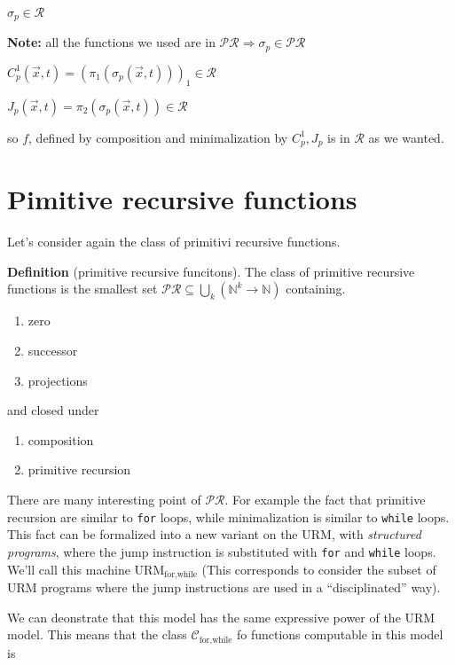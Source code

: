 \documentclass{amsbook}
\theoremstyle{definition}
\theoremstyle{remark}
\numberwithin{section}{chapter}
\numberwithin{equation}{chapter}
\begin{document}
$\sigma_p \in \mathcal{R}$

\textbf{Note:} all the functions we used are in  $\mathcal{PR} \Rightarrow \sigma_p \in \mathcal{PR}$

$C_p^1(\vec{x}, t) = (\pi_1(\sigma_p(\vec{x}, t)))_1 \in \mathcal{R}$

$J_p(\vec{x}, t) = \pi_2(\sigma_p(\vec{x}, t)) \in \mathcal{R}$

so $f$, defined by composition and minimalization by $C_p^1, J_p$ is in $\mathcal{R}$ as we wanted.

\hfill \qedsymbol

\chapter{Pimitive recursive functions}
Let's consider again the class of primitivi recursive functions.

\textbf{Definition} (primitive recursive funcitons).  The class of
primitive recursive functions is the smallest set
$\mathcal{PR} \subseteq \bigcup\limits_k(\mathbb{N}^k \rightarrow
\mathbb{N})$ containing.

\begin{enumerate}[label=(\alph*)]
\item zero
\item successor
\item projections
\end{enumerate}

and closed under

\begin{enumerate}[label=(\arabic*)]
\item composition
\item primitive recursion
\end{enumerate}

There are many interesting point of $\mathcal{PR}$. For example the
fact that primitive recursion are similar to \texttt{for} loops, while
minimalization is similar to \texttt{while} loops. This fact can be
formalized into a new variant on the URM, with \textit{structured
  programs}, where the jump instruction is substituted with
\texttt{for} and \texttt{while} loops. We'll call this machine
$\text{URM}_{\text{for,while}}$ (This corresponds to consider the
subset of URM programs where the jump instructions are used in a
``disciplinated'' way).

We can deonstrate that this model has the same expressive power of the
URM model. This means that the class $\mathcal{C}_{\text{for,while}}$
fo functions computable in this model is
\end{document}
